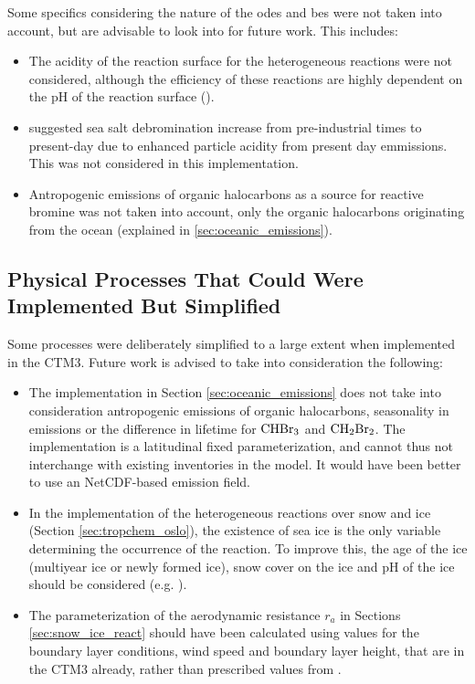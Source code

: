 Some specifics considering the nature of the \acrshort{ode}s and \acrlong{be}s were not taken into account, but are advisable to look into for future work. This includes: 
\begin{itemize}
    \item The acidity of the reaction surface for the heterogeneous reactions were not considered, although the efficiency of these reactions are highly dependent on the pH of the reaction surface (\cite{KerriAPratt2013}).
    \item \cite{Parella} suggested sea salt debromination increase from pre-industrial times to present-day due to enhanced particle acidity from present day emmissions. This was not considered in this implementation.
    \item Antropogenic emissions of organic halocarbons as a source for reactive bromine was not taken into account, only the organic halocarbons originating from the ocean (explained in \ref{sec:oceanic_emissions}).  
\end{itemize}

\subsection{Physical Processes That Could Were Implemented But Simplified}

Some processes were deliberately simplified to a large extent when implemented in the CTM3. Future work is advised to take into consideration the following: 

\begin{itemize}
    \item The implementation in Section \ref{sec:oceanic_emissions} does not take into consideration antropogenic emissions of organic halocarbons, seasonality in emissions or the difference in lifetime for $\mathrm{CHBr_3}$ and $\mathrm{CH_2Br_2}$. The implementation is a latitudinal fixed parameterization, and cannot thus not interchange with existing inventories in the model. It would have been better to use an NetCDF-based emission field. 
    \item In the implementation of the heterogeneous reactions over snow and ice (Section \ref{sec:tropchem_oslo}), the existence of sea ice is the only variable determining the occurrence of the reaction. To improve this, the age of the ice (multiyear ice or newly formed ice), snow cover on the ice and pH of the ice should be considered (e.g. \cite{Peterson2019}).
    \item The parameterization of the aerodynamic resistance $r_a$ in Sections \ref{sec:snow_ice_react} should have been calculated using values for the boundary layer conditions, wind speed and boundary layer height, that are in the CTM3 already, rather than prescribed values from \cite{CAO}. 
\end{itemize}


